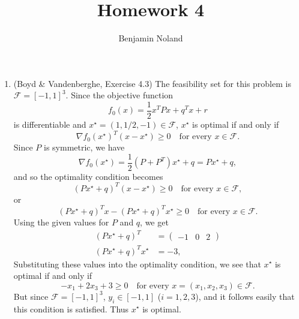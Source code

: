 \documentclass[letterpaper,12pt]{article}
\title{Homework 4}
\author{Benjamin Noland}
\date{}
\begin{document}
\maketitle

\begin{enumerate}
\item (Boyd \& Vandenberghe, Exercise 4.3) The feasibility set for
  this problem is $\mathcal{F} = [-1, 1]^3$. Since the objective
  function
  \begin{equation*}
    f_0(x) = \frac{1}{2} x^T P x + q^T x + r
  \end{equation*}
  is differentiable and $x^\star = (1, 1/2, -1) \in \mathcal{F}$,
  $x^\star$ is optimal if and only if
  \begin{equation*}
    \nabla f_0(x^\star)^T (x - x^\star) \geq 0
      \quad \text{for every $x \in \mathcal{F}$}.
  \end{equation*}
  Since $P$ is symmetric, we have
  \begin{equation*}
    \nabla f_0(x^\star) = \frac{1}{2} (P + P^T) x^\star + q = Px^\star + q,
  \end{equation*}
  and so the optimality condition becomes
  \begin{equation*}
    \left( Px^\star + q \right)^T (x - x^\star) \geq 0
      \quad \text{for every $x \in \mathcal{F}$},
  \end{equation*}
  or
  \begin{equation*}
    \left( Px^\star + q \right)^T x
      - \left( Px^\star + q \right)^T x^\star \geq 0
      \quad \text{for every $x \in \mathcal{F}$}.
  \end{equation*}
  Using the given values for $P$ and $q$, we get
  \begin{align*}
    \left( Px^\star + q \right)^T
      &= \begin{pmatrix}
           -1 & 0 & 2
         \end{pmatrix} \\
    \left( Px^\star + q \right)^T x^\star &= -3,
  \end{align*}
  Substituting these values into the optimality condition, we see that
  $x^\star$ is optimal if and only if
  \begin{equation*}
    -x_1 + 2x_3 + 3 \geq 0
      \quad \text{for every $x = (x_1, x_2, x_3) \in \mathcal{F}$}.
  \end{equation*}
  But since $\mathcal{F} = [-1, 1]^3$, $y_i \in [-1, 1]$
  ($i = 1, 2, 3$), and it follows easily that this condition is
  satisfied. Thus $x^\star$ is optimal.


\end{enumerate}
\end{document}
